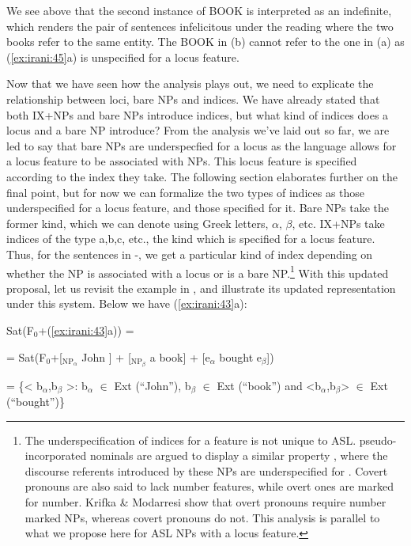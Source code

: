 \documentclass[output=paper,
modfonts
]{langscibook}
\begin{document}
We see above that the second instance of BOOK is interpreted as an indefinite, which renders the pair of sentences infelicitous under the reading where the two books refer to the same entity. The BOOK in (b) cannot refer to the one in (a) as (\ref{ex:irani:45}a) is unspecified for a locus feature. 

Now that we have seen how the analysis plays out, we need to explicate the relationship between loci, bare NPs and indices. We have already stated that both IX+NPs and bare NPs introduce indices, but what kind of indices does a locus and a bare NP introduce? From the analysis we've laid out so far, we are led to say that bare NPs are underspecfied for a locus as the language allows for a locus feature to be associated with NPs. This locus feature is specified according to the index they take. The following section elaborates further on the final point, but for now we can formalize the two types of indices as those underspecified for a locus feature, and those specified for it. Bare NPs take the former kind, which we can denote using Greek letters, \(\alpha\), \(\beta\), etc. IX+NPs take indices of the type a,b,c, etc., the kind which is specified for a locus feature. Thus, for the sentences in -, we get a particular kind of index depending on whether the NP is associated with a locus or is a bare NP.\footnote{The underspecification of indices for a feature is not unique to ASL.  pseudo-incorporated nominals are argued to display a similar property \citep{KrifkaModarresi2016}, where the discourse referents introduced by these NPs are underspecified for . Covert pronouns are also said to lack number features, while overt ones are marked for number. Krifka \& Modarresi show that overt pronouns require number marked NPs, whereas covert pronouns do not. This analysis is parallel to what we propose here for ASL NPs with a locus feature.} With this updated proposal, let us revisit the example in , and illustrate its updated representation under this system. Below we have (\ref{ex:irani:43}a):  

\begin{exe}

\ex Sat(F$_0$+(\ref{ex:irani:43}a)) = \par 
= Sat(F$_0$+[$_{\text{NP}_\alpha}$ John ] + [$_{\text{NP}_\beta}$ a book] + [e$_{\alpha}$ bought e$_{\beta}$]) \par 
= \{< b$_{\alpha}$,b$_{\beta}$ >: b$_{\alpha}$ \(\in\) Ext (``John''), b$_{\beta}$ \(\in\) Ext (``book'') and <b$_{\alpha}$,b$_{\beta}$> \(\in\) Ext (``bought'')\} \par 

\end{exe}
\end{document}
